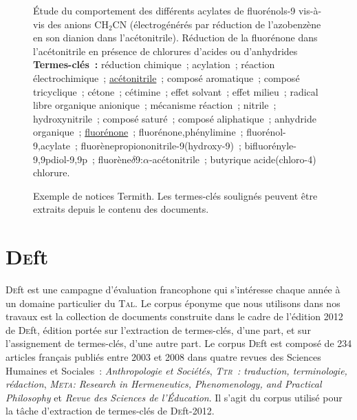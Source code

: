 \begin{figure}
{{          Étude du comportement des différents acylates de fluorénols-9
          vis-à-vis des anions CH$_2$CN (électrogénérés par réduction de
          l'azobenzène en son dianion dans l'acétonitrile). Réduction de la
          fluorénone dans l'acétonitrile en présence de chlorures d'acides ou
          d'anhydrides\\

          \textbf{Termes-clés~:} réduction chimique~; acylation~; réaction
          électrochimique~; \underline{acétonitrile}~; composé aromatique~;
          composé tricyclique~; cétone~; cétimine~; effet solvant~; effet
          milieu~; radical libre organique anionique~; mécanisme réaction~;
          nitrile~; hydroxynitrile~; composé saturé~; composé aliphatique~;
          anhydride organique~; \underline{fluorénone}~;
          fluorénone,phénylimine~; fluorénol-9,acylate~;
          fluorènepropiononitrile-9(hydroxy-9)~; bifluorényle-9,9pdiol-9,9p~;
          fluorène$\delta$9:$\alpha$-acétonitrile~; butyrique acide(chloro-4)
          chlorure.
        }
      }
      \caption[Exemple de notices Termith]{
        Exemple de notices Termith. Les termes-clés soulignés peuvent être
        extraits depuis le contenu des documents.
        \label{fig:example_inist}
      }
    \end{figure}


  \section[\textsc{De}ft]{\textsc{De}ft~\textnormal{\large\cite{paroubek2012deft}}}
  \label{sec:main-data_description-deft_data}
    \textsc{De}ft est une campagne d'évaluation francophone qui s'intéresse
    chaque année à un domaine particulier du \textsc{Tal}. Le corpus éponyme que
    nous utilisons dans nos travaux est la collection de documents construite
    dans le cadre de l'édition 2012 de \textsc{De}ft, édition portée sur
    l'extraction de termes-clés, d'une part, et sur l'assignement de
    termes-clés, d'une autre part. Le corpus \textsc{De}ft est composé de 234
    articles français publiés entre 2003 et 2008 dans quatre revues des Sciences
    Humaines et Sociales~: \textit{Anthropologie et Sociétés},
    \textit{\textsc{Ttr}~: traduction, terminologie, rédaction},
    \textit{\textsc{Meta}: Research in Hermeneutics, Phenomenology, and
    Practical Philosophy} et \textit{Revue des Sciences de l'Éducation}. Il
    s'agit du corpus utilisé pour la tâche d'extraction de termes-clés de
    \textsc{De}ft-2012.
    
